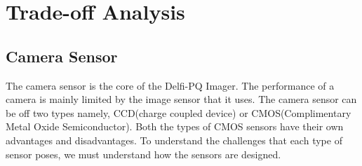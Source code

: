\section{Trade-off Analysis}
\label{sec:tradeOff}
\subsection{Camera Sensor}
The camera sensor is the core of the Delfi-PQ Imager. The performance of a camera is mainly limited by the image sensor that it uses\cite{cmos}. The camera sensor can be off two types namely, CCD(charge coupled device) or CMOS(Complimentary Metal Oxide Semiconductor). Both the types of CMOS sensors have their own advantages and disadvantages. To understand the challenges that each type of sensor poses, we must understand how the sensors are designed.

